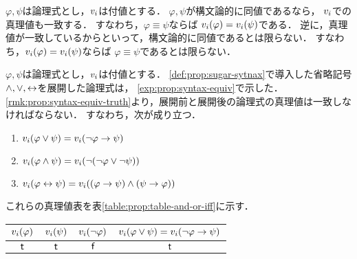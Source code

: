 \begin{myRemark}[構文論的同値と真理値]
  \label{rmk:prop:syntax-equiv-truth}
  $\varphi, \psi$は論理式とし，$v_i$は付値とする．
  $\varphi,\psi$が構文論的に同値であるなら，
  $v_i$での真理値も一致する．
  すなわち，$\varphi \equiv \psi$ならば
  $v_i(\varphi) = v_i(\psi)$である．
  逆に，真理値が一致しているからといって，構文論的に同値であるとは限らない．
  すなわち，$v_i(\varphi) = v_i(\psi)$ならば
  $\varphi \equiv \psi$であるとは限らない．
\end{myRemark}

\begin{myCorollary}
  \label{cor:prop:valuation-sugar-syntax}
  $\varphi, \psi$は論理式とし，$v_i$は付値とする．
  \ref{def:prop:sugar-sytnax}で導入した省略記号$\land, \lor, \leftrightarrow$を展開した論理式は，
  \ref{exp:prop:syntax-equiv}で示した．
  \ref*{rmk:prop:syntax-equiv-truth}より，展開前と展開後の論理式の真理値は一致しなければならない．
  すなわち，次が成り立つ．
  \begin{enumerate}
    \item $v_i(\varphi \lor \psi) = v_i(\lnot \varphi \to \psi)$
    \item $v_i(\varphi \land \psi) = v_i(\lnot(\lnot\varphi \lor \lnot\psi))$
    \item $v_i(\varphi \leftrightarrow \psi) = v_i((\varphi \to \psi) \land (\psi \to \varphi))$
  \end{enumerate}
  これらの真理値表を表\ref{table:prop:table-and-or-iff}に示す．
  \begin{table}[H]
    \begin{subtable}{\linewidth}
      \centering
      \begin{tabular}{|c|c|c|c|}\hline
        $v_i(\varphi)$ & $v_i(\psi)$ & $v_i(\lnot\varphi)$ & $v_i(\varphi \lor \psi) = v_i(\lnot \varphi \to \psi)$ \\ \hline
        $\mathsf{t}$                                  & $\mathsf{t}$                               & $\mathsf{f}$                                      & $\mathsf{t}$                                                                                                      \\ \hline

\end{tabular}
\end{subtable}
\end{table}
\end{myCorollary}
